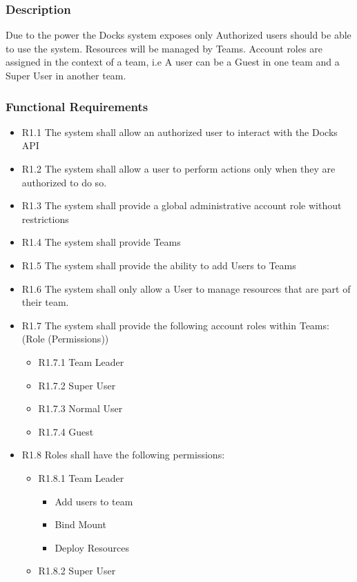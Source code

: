 \documentclass[]{article}
\begin{document}
\subsubsection{Description}
Due to the power the Docks system exposes only Authorized users should be able to use the system.
Resources will be managed by Teams. Account roles are assigned in the context of a team, i.e A
user can be a Guest in one team and a Super User in another team.

\subsubsection{Functional Requirements}

\begin{itemize}
	\item R1.1 The system shall allow an authorized user to interact with the Docks API
	\item R1.2 The system shall allow a user to perform actions only when they are authorized to do so. 
	\item R1.3 The system shall provide a global administrative account role without restrictions
	\item R1.4 The system shall provide Teams
	\item R1.5 The system shall provide the ability to add Users to Teams
	\item R1.6 The system shall only allow a User to manage resources that are part of their team.
	\item R1.7 The system shall provide the following account roles within Teams: (Role (Permissions))
	\begin{itemize}
		\item R1.7.1 Team Leader
		\item R1.7.2 Super User
		\item R1.7.3 Normal User
		\item R1.7.4 Guest
	\end{itemize}
	\item R1.8 Roles shall have the following permissions:
		\begin{itemize}
			\item R1.8.1 Team Leader
			\begin{itemize}
				\item Add users to team
				\item Bind Mount
				\item Deploy Resources
			\end{itemize}
		\item R1.8.2 Super User

\end{itemize}
\end{itemize}
\end{document}
